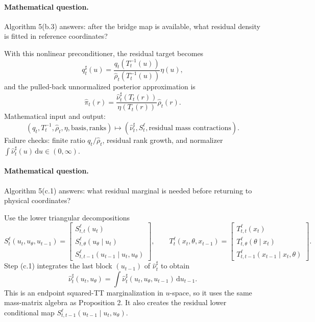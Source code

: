 \documentclass[11pt]{article}
\numberwithin{equation}{section}
\newcommand{\dd}{\,\mathrm d}
\begin{document}
\paragraph{Mathematical question.}
Algorithm 5(b.3) answers: after the bridge map is available, what residual
density is fitted in reference coordinates?

With this nonlinear preconditioner, the residual target becomes
\begin{equation}
    q^\sharp_t(u)
    =
    \frac{q_t(T_t^{-1}(u))}
    {\widehat\rho_t(T_t^{-1}(u))}
    \eta(u),
    \label{eq:p24-p12}
\end{equation}
and the pulled-back unnormalized posterior approximation is
\begin{equation}
    \widehat\pi_t(r)
    =
    \frac{\widehat\nu^\sharp_t(T_t(r))}
    {\eta(T_t(r))}
    \widehat\rho_t(r).
    \label{eq:p24-p13}
\end{equation}
Mathematical input and output:
\begin{equation}
    (q_t,T_t^{-1},\widehat\rho_t,\eta,\text{basis},\text{ranks})
    \mapsto
    (\widehat\nu_t^\sharp,S_t^\ell,\text{residual mass contractions}).
    \label{eq:p24-p13a}
\end{equation}
Failure checks: finite ratio \(q_t/\widehat\rho_t\), residual rank growth, and
normalizer \(\int\widehat\nu_t^\sharp(u)\dd u\in(0,\infty)\).

\paragraph{Mathematical question.}
Algorithm 5(c.1) answers: what residual marginal is needed before returning to
physical coordinates?

Use
the lower triangular decompositions
\begin{equation}
    S_t^{\ell}(u_t,u_\theta,u_{t-1})
    =
    \begin{bmatrix}
    S_{t,t}^{\ell}(u_t)\\
    S_{t,\theta}^{\ell}(u_\theta\mid u_t)\\
    S_{t,t-1}^{\ell}(u_{t-1}\mid u_t,u_\theta)
    \end{bmatrix},
    \qquad
    T_t^{\ell}(x_t,\theta,x_{t-1})
    =
    \begin{bmatrix}
    T_{t,t}^{\ell}(x_t)\\
    T_{t,\theta}^{\ell}(\theta\mid x_t)\\
    T_{t,t-1}^{\ell}(x_{t-1}\mid x_t,\theta)
    \end{bmatrix}.
    \label{eq:p24-p14}
\end{equation}
Step (c.1) integrates the last block \((u_{t-1})\) of
\(\widehat\nu_t^\sharp\) to obtain
\begin{equation}
    \widehat\nu_t^\sharp(u_t,u_\theta)
    =
    \int\widehat\nu_t^\sharp(u_t,u_\theta,u_{t-1})\dd u_{t-1}.
    \label{eq:p24-p15}
\end{equation}
This is an endpoint squared-TT marginalization in \(u\)-space, so it uses the
same mass-matrix algebra as Proposition 2.  It also creates the residual lower
conditional map \(S_{t,t-1}^{\ell}(u_{t-1}\mid u_t,u_\theta)\).
\end{document}
